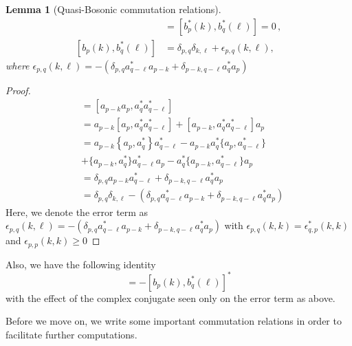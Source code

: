 \documentclass[sn-mathphys,Numbered, a4paper ,nocrop]{sn-jnl}%
\theoremstyle{plain}
\newtheorem{lemma}[theorem]{Lemma}
\theoremstyle{definition}
\theoremstyle{remark}
\theoremstyle{plain}
\theoremstyle{definition}
\theoremstyle{remark}
\begin{document}
\begin{lemma}[Quasi-Bosonic commutation relations]
   \begin{align}
       [b_{p}(k),b_{q}(\ell)] &= [b^*_{p}(k),b^*_{q}(\ell)] = 0\,,\\
       [b_{p}(k),b^*_{q}(\ell)] &= \delta_{p,q}\delta_{k,\ell} + \epsilon_{p,q}(k,\ell),
   \end{align} where $\epsilon_{p,q}(k,\ell) = -\left(\delta_{p,q}a^*_{q-\ell}a_{p-k} + \delta_{p-k,q-\ell}a^*_{q}a_{p}\right)$ 
    \end{lemma}
\begin{proof}
    \begin{align}
        [b_{p}(k),b^*_{q}(\ell)] &= [a_{p-k}a_{p},a^*_{q}a^*_{q-\ell}]\nonumber\\
        &= a_{p-k}[a_p,a^*_{q}a^*_{q-\ell}] + [a_{p-k},a^*_{q}a^*_{q-\ell}]a_{p}\nonumber\\
        &= a_{p-k}\left\{a_p,a^*_{q}\right\}a^*_{q-\ell} - a_{p-k}a^*_{q}\{a_{p},a^*_{q-\ell}\}\nonumber \\ &+ \{a_{p-k},a^*_q\}a^*_{q-\ell}a_{p} - a^*_{q}\{a_{p-k},a^*_{q-\ell}\}a_{p}\nonumber\\
        &=\delta_{p,q}a_{p-k}a^*_{q-\ell} + \delta_{p-k,q-\ell}a^*_{q}a_{p}\nonumber\\
        &= \delta_{p,q}\delta_{k,\ell}-\left(\delta_{p,q}a^*_{q-\ell}a_{p-k} + \delta_{p-k,q-\ell}a^*_{q}a_{p}\right)
    \end{align}
Here, we denote the error term as $\epsilon_{p,q}(k,\ell) = -\left(\delta_{p,q}a^*_{q-\ell}a_{p-k} + \delta_{p-k,q-\ell}a^*_{q}a_{p}\right)$ with $\epsilon_{p,q}(k,k) = \epsilon^*_{q,p}(k,k) $ and $\epsilon_{p,p}(k,k)\geq 0$
\end{proof}
Also, we have the following identity
\begin{equation}
    [b^*_p(k), b_q(\ell)] = -[b_{p}(k),b^*_{q}(\ell)]^*
\end{equation}
with the effect of the complex conjugate seen only on the error term as above.  

Before we move on, we write some important commutation relations in order to facilitate further computations.\newline
\end{document}
